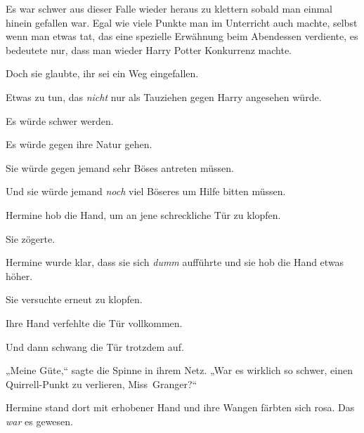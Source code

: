 Es war schwer aus dieser Falle wieder heraus zu klettern sobald man einmal hinein gefallen war. Egal wie viele Punkte man im Unterricht auch machte, selbst wenn man etwas tat, das eine spezielle Erwähnung beim Abendessen verdiente, es bedeutete nur, dass man wieder Harry Potter Konkurrenz machte.

Doch sie glaubte, ihr sei ein Weg eingefallen.

Etwas zu tun, das \emph{nicht} nur als Tauziehen gegen Harry angesehen würde.

Es würde schwer werden.

Es würde gegen ihre Natur gehen.

Sie würde gegen jemand sehr Böses antreten müssen.

Und sie würde jemand \emph{noch} viel Böseres um Hilfe bitten müssen.

Hermine hob die Hand, um an jene schreckliche Tür zu klopfen.

Sie zögerte.

Hermine wurde klar, dass sie sich \emph{dumm} aufführte und sie hob die Hand etwas höher.

Sie versuchte erneut zu klopfen.

Ihre Hand verfehlte die Tür vollkommen.

Und dann schwang die Tür trotzdem auf.

„Meine Güte,“ sagte die Spinne in ihrem Netz. „War es wirklich so schwer, einen Quirrell-Punkt zu verlieren, Miss~Granger?“

Hermine stand dort mit erhobener Hand und ihre Wangen färbten sich rosa. Das \emph{war} es gewesen.

